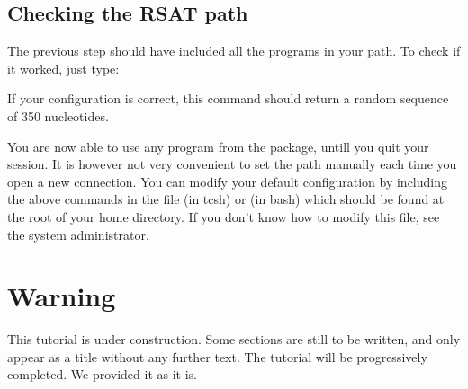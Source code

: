 \subsection{Checking the RSAT path}

 The previous step should have included all the \RSAT programs in
your path.  To check if it worked, just type:


If your configuration is correct, this command should return a random
sequence of 350 nucleotides.

You are now able to use any program from the \RSAT package, untill you
quit your session. It is however not very convenient to set the path
manually each time you open a new connection. You can modify your
default configuration by including the above commands in the file
 (in tcsh) or  (in bash) which should be
found at the root of your home directory. If you don't know how to
modify this file, see the system administrator.


\section{Warning}

This tutorial is under construction. Some sections are still to be
written, and only appear as a title without any further text. The
tutorial will be progressively completed. We provided it as it is.
